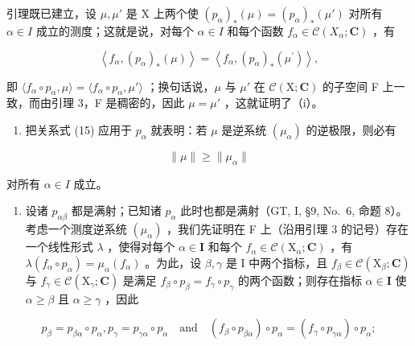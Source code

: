引理既已建立，设 \(\mu, \mu'\) 是 X 上两个使 \((p_{\alpha})_{*}(\mu) = (p_{\alpha})_{*}(\mu')\) 对所有 \(\alpha \in I\) 成立的测度；这就是说，对每个 \(\alpha \in I\) 和每个函数 \(f_{\alpha} \in \mathcal{C}(X_{\alpha}; \mathbf{C})\) ，有

\[
\left\langle f _ {\alpha}, \left(p _ {\alpha}\right) _ {*} (\mu) \right\rangle = \left\langle f _ {\alpha}, \left(p _ {\alpha}\right) _ {*} \left(\mu^ {\prime}\right) \right\rangle ,
\]

即 \(\langle f_{\alpha} \circ p_{\alpha}, \mu \rangle = \langle f_{\alpha} \circ p_{\alpha}, \mu' \rangle\) ；换句话说，\(\mu\) 与 \(\mu'\) 在 \(\mathcal{C}(\mathrm{X}; \mathbf{C})\) 的子空间 F 上一致，而由引理 3，F 是稠密的，因此 \(\mu = \mu'\) ，这就证明了（i）。

\begin{enumerate}
\def\labelenumi{(\roman{enumi})}
\setcounter{enumi}{1}
\tightlist
\item
  把关系式 (15) 应用于 \(p_{\alpha}\) 就表明：若 \(\mu\) 是逆系统 \((\mu_{\alpha})\) 的逆极限，则必有
\end{enumerate}

\[
\| \mu \| \geqslant \| \mu_ {\alpha} \|\tag{16}
\]

对所有 \(\alpha \in I\) 成立。

\begin{enumerate}
\def\labelenumi{(\roman{enumi})}
\setcounter{enumi}{2}
\tightlist
\item
  设诸 \(p_{\alpha \beta}\) 都是满射；已知诸 \(p_{\alpha}\) 此时也都是满射（GT, I, §9, No.~6, 命题 8）。考虑一个测度逆系统 \((\mu_{\alpha})\) ，我们先证明在 F 上（沿用引理 3 的记号）存在一个线性形式 \(\lambda\) ，使得对每个 \(\alpha \in \mathbf{I}\) 和每个 \(f_{\alpha} \in \mathcal{C}(\mathrm{X}_{\alpha}; \mathbf{C})\) ，有 \(\lambda(f_{\alpha} \circ p_{\alpha}) = \mu_{\alpha}(f_{\alpha})\) 。为此，设 \(\beta, \gamma\) 是 I 中两个指标，且 \(f_{\beta} \in \mathcal{C}(\mathrm{X}_{\beta}; \mathbf{C})\) 与 \(f_{\gamma} \in \mathcal{C}(\mathrm{X}_{\gamma}; \mathbf{C})\) 是满足 \(f_{\beta} \circ p_{\beta} = f_{\gamma} \circ p_{\gamma}\) 的两个函数；则存在指标 \(\alpha \in \mathbf{I}\) 使 \(\alpha \geqslant \beta\) 且 \(\alpha \geqslant \gamma\) ，因此
\end{enumerate}

\[
p _ {\beta} = p _ {\beta \alpha} \circ p _ {\alpha}, p _ {\gamma} = p _ {\gamma \alpha} \circ p _ {\alpha} \quad \text {and} \quad (f _ {\beta} \circ p _ {\beta \alpha}) \circ p _ {\alpha} = (f _ {\gamma} \circ p _ {\gamma \alpha}) \circ p _ {\alpha};
\]

